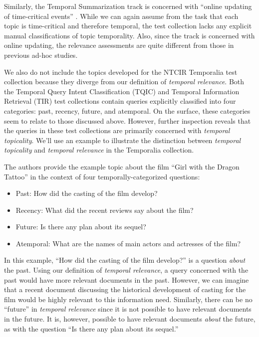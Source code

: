\documentclass{sig-alternate}
\begin{document}
Similarly, the Temporal Summarization track is concerned with ``online updating of time-critical events'' \cite{Guo2013}. While we can again assume from the task that each topic is time-critical and therefore temporal, the test collection lacks any explicit manual classifications of topic temporality.  Also, since the track is concerned with online updating, the relevance assessments are quite different from those in previous ad-hoc studies.

We also do not include the topics developed for the NTCIR Temporalia test collection \cite{Joho2014} because they diverge from our definition of \emph{temporal relevance}.  Both the Temporal Query Intent Classification (TQIC) and Temporal Information Retrieval (TIR) test collections contain queries explicitly classified into four categories: past, recency, future, and atemporal. On the surface, these categories seem to relate to those discussed above. However, further inspection reveals that the queries in these test collections are primarily concerned with \emph{temporal topicality}.  
We'll use an example to illustrate the distinction between \emph{temporal topicality} and \emph{temporal relevance} in the Temporalia collection. 

The authors provide the example topic about the film ``Girl with the Dragon Tattoo'' in the context of four temporally-categorized questions:

\begin{itemize}
\item Past: How did the casting of the film develop?
\item Recency: What did the recent reviews say about the film?
\item Future: Is there any plan about its sequel?
\item Atemporal: What are the names of main actors and actresses of the film?
\end{itemize}

In this example, ``How did the casting of the film develop?'' is a question \emph{about} the past. Using our definition of \emph{temporal relevance}, a query concerned with the past would have more relevant documents in the past. However, we can imagine that a recent document discussing the historical development of casting for the film would be highly relevant to this information need. Similarly, there can be no ``future'' in \emph{temporal relevance} since it is not possible to have relevant documents in the future. It is, however, possible to have relevant documents \emph{about} the future, as with the question ``Is there any plan about its sequel.''
\end{document}
